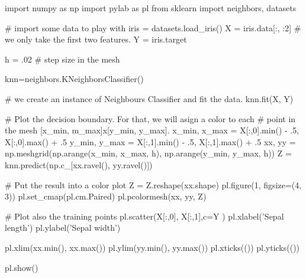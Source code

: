 \documentclass[a4pper,11pt,onecolumn]{article}
\begin{document}
\begin{python}
import numpy as np
import pylab as pl
from sklearn import neighbors, datasets

# import some data to play with
iris = datasets.load_iris()
X = iris.data[:, :2] # we only take the first two features. 
Y = iris.target


h = .02 # step size in the mesh

knn=neighbors.KNeighborsClassifier()

# we create an instance of Neighbours Classifier and fit the data.
knn.fit(X, Y)

# Plot the decision boundary. For that, we will asign a color to each
# point in the mesh [x_min, m_max]x[y_min, y_max].
x_min, x_max = X[:,0].min() - .5, X[:,0].max() + .5
y_min, y_max = X[:,1].min() - .5, X[:,1].max() + .5
xx, yy = np.meshgrid(np.arange(x_min, x_max, h), np.arange(y_min, y_max, h))
Z = knn.predict(np.c_[xx.ravel(), yy.ravel()])

# Put the result into a color plot
Z = Z.reshape(xx.shape)
pl.figure(1, figsize=(4, 3))
pl.set_cmap(pl.cm.Paired)
pl.pcolormesh(xx, yy, Z)

# Plot also the training points
pl.scatter(X[:,0], X[:,1],c=Y )
pl.xlabel('Sepal length')
pl.ylabel('Sepal width')

pl.xlim(xx.min(), xx.max())
pl.ylim(yy.min(), yy.max())
pl.xticks(())
pl.yticks(())

pl.show()	
\end{python}
\end{document}
